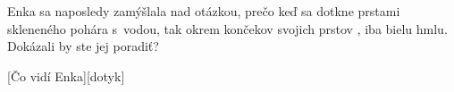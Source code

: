 Enka sa naposledy zamýšlala nad otázkou, prečo keď sa dotkne prstami skleneného pohára s~vodou, tak okrem končekov svojich prstov , iba bielu hmlu. Dokázali by ste jej poradiť?


[Čo vidí Enka][dotyk]

